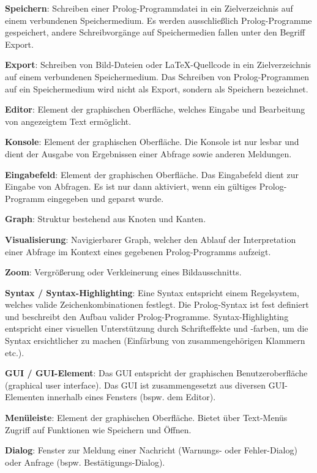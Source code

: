 \documentclass[parskip=full,11pt,twoside]{scrartcl}
\begin{document}
\textbf{Speichern}:
Schreiben einer Prolog-Programmdatei in ein Zielverzeichnis auf einem verbundenen Speichermedium. Es werden ausschließlich Prolog-Programme gespeichert, andere Schreibvorgänge auf Speichermedien fallen unter den Begriff Export.

\textbf{Export}:
Schreiben von Bild-Dateien oder LaTeX-Quellcode in ein Zielverzeichnis auf einem verbundenen Speichermedium. Das Schreiben von Prolog-Programmen auf ein Speichermedium wird nicht als Export, sondern als Speichern bezeichnet.

\textbf{Editor}:
Element der graphischen Oberfläche, welches Eingabe und Bearbeitung von angezeigtem Text ermöglicht.

\textbf{Konsole}:
Element der graphischen Oberfläche. Die Konsole ist nur lesbar und dient der Ausgabe von Ergebnissen einer Abfrage sowie anderen Meldungen. 

\textbf{Eingabefeld}:
Element der graphischen Oberfläche. Das Eingabefeld dient zur Eingabe von Abfragen. Es ist nur dann aktiviert, wenn ein gültiges Prolog-Programm eingegeben und geparst wurde.

\textbf{Graph}:
Struktur bestehend aus Knoten und Kanten.

\textbf{Visualisierung}:
Navigierbarer Graph, welcher den Ablauf der Interpretation einer Abfrage im Kontext eines gegebenen Prolog-Programms aufzeigt.

\textbf{Zoom}:
Vergrößerung oder Verkleinerung eines Bildausschnitts.

\textbf{Syntax / Syntax-Highlighting}:
Eine Syntax entspricht einem Regelsystem, welches valide Zeichenkombinationen festlegt. Die Prolog-Syntax ist fest definiert und beschreibt den Aufbau valider Prolog-Programme. Syntax-Highlighting entspricht einer visuellen Unterstützung durch Schrifteffekte und -farben, um die Syntax ersichtlicher zu machen (Einfärbung von zusammengehörigen Klammern etc.).

\textbf{GUI / GUI-Element}:
Das GUI entspricht der graphischen Benutzeroberfläche (graphical user interface). Das GUI ist zusammengesetzt aus diversen GUI-Elementen innerhalb eines Fensters (bspw. dem Editor).

\textbf{Menüleiste}:
Element der graphischen Oberfläche. Bietet über Text-Menüs Zugriff auf Funktionen wie Speichern und Öffnen.

\textbf{Dialog}:
Fenster zur Meldung einer Nachricht (Warnungs- oder Fehler-Dialog) oder Anfrage (bspw. Bestätigungs-Dialog).
\end{document}
